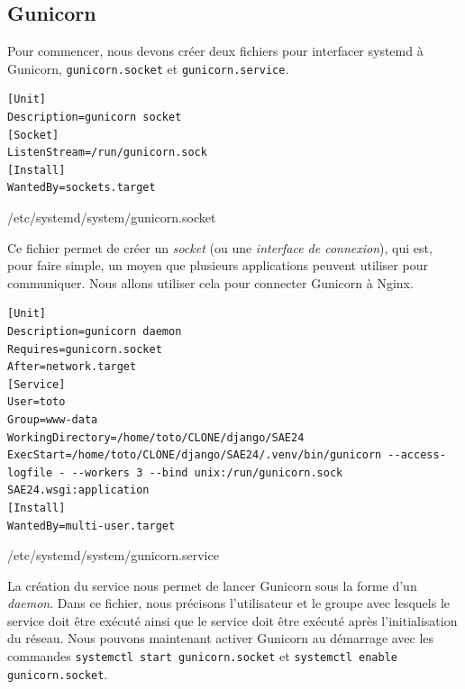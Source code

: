 \documentclass{article}
\begin{document}
\subsection{Gunicorn}
    Pour commencer, nous devons créer deux fichiers pour interfacer systemd à Gunicorn, \verb|gunicorn.socket| et \verb|gunicorn.service|.
    \begin{listing}[H]
        \begin{verbatim}
[Unit]
Description=gunicorn socket
[Socket]
ListenStream=/run/gunicorn.sock
[Install]
WantedBy=sockets.target
        \end{verbatim}
        \caption{/etc/systemd/system/gunicorn.socket}
        \label{code:gunicorn.socket}
    \end{listing}
    Ce fichier permet de créer un \emph{socket} (ou une \emph{interface de connexion}), qui est, pour faire simple, un moyen que plusieurs applications peuvent utiliser pour communiquer.
    Nous allons utiliser cela pour connecter Gunicorn à Nginx.
    \begin{listing}[H]
        \begin{verbatim}
[Unit]
Description=gunicorn daemon
Requires=gunicorn.socket
After=network.target
[Service]
User=toto
Group=www-data
WorkingDirectory=/home/toto/CLONE/django/SAE24
ExecStart=/home/toto/CLONE/django/SAE24/.venv/bin/gunicorn --access-logfile - --workers 3 --bind unix:/run/gunicorn.sock SAE24.wsgi:application
[Install]
WantedBy=multi-user.target
        \end{verbatim}
        \caption{/etc/systemd/system/gunicorn.service}
        \label{code:gunicorn.service} 
    \end{listing}
    La création du service nous permet de lancer Gunicorn sous la forme d'un \emph{daemon}.
    Dans ce fichier, nous précisons l'utilisateur et le groupe avec lesquels le service doit être exécuté ainsi que le service doit être exécuté après l'initialisation du réseau.
    Nous pouvons maintenant activer Gunicorn au démarrage avec les commandes \verb|systemctl start gunicorn.socket| et \verb|systemctl enable gunicorn.socket|.
\end{document}

